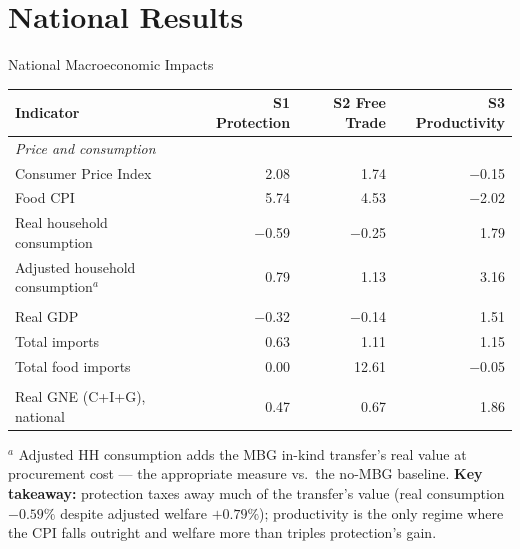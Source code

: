 \documentclass[11pt,aspectratio=169]{beamer}
\begin{document}
\section{National Results}

\begin{frame}{National Macroeconomic Impacts}
\centering
\footnotesize
\begin{tabular}{lrrr}
	\toprule
	\textbf{Indicator} & \textbf{S1 Protection} & \textbf{S2 Free Trade} & \textbf{S3 Productivity} \\
	\midrule
	\multicolumn{4}{l}{\textit{Price and consumption}} \\
	\rowcolor{lubrown10} Consumer Price Index               &  2.08  &  1.74  & $-$0.15 \\
	Food CPI                           &  5.74  &  4.53  & $-$2.02 \\
	\rowcolor{lubrown10} Real household consumption         & $-$0.59 & $-$0.25 &  1.79 \\
	\rowcolor{lubrown10} Adjusted household consumption$^a$ &  0.79  &  1.13  &  3.16 \\
	\addlinespace
	\multicolumn{4}{l}{\textit{Output and trade}} \\
	Real GDP                           & $-$0.32 & $-$0.14 &  1.51 \\
	Total imports                      &  0.63  &  1.11  &  1.15 \\
	Total food imports                 &  0.00  & 12.61  & $-$0.05 \\
	\addlinespace
	\multicolumn{4}{l}{\textit{Welfare}} \\
	Real GNE (C+I+G), national         &  0.47  &  0.67  &  1.86 \\
	\bottomrule
\end{tabular}
\vspace{3pt}

{\tiny $^a$ Adjusted HH consumption adds the MBG in-kind transfer's real value at procurement cost --- the appropriate measure vs.\ the no-MBG baseline. \textcolor{lubrown}{\textbf{Key takeaway:}} protection taxes away much of the transfer's value (real consumption $-0.59\%$ despite adjusted welfare $+0.79\%$); productivity is the only regime where the CPI falls outright and welfare more than triples protection's gain.}
\end{frame}
\end{document}
